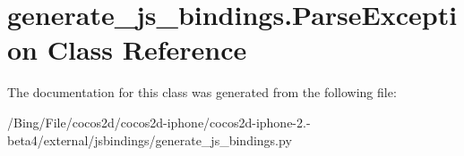 \hypertarget{classgenerate__js__bindings_1_1_parse_exception}{\section{generate\-\_\-js\-\_\-bindings.\-Parse\-Exception Class Reference}
\label{classgenerate__js__bindings_1_1_parse_exception}
}


The documentation for this class was generated from the following file\-:\begin{DoxyCompactItemize}
\item 
/\-Bing/\-File/cocos2d/cocos2d-\/iphone/cocos2d-\/iphone-\/2.-\/beta4/external/jsbindings/generate\-\_\-js\-\_\-bindings.\-py\end{DoxyCompactItemize}
